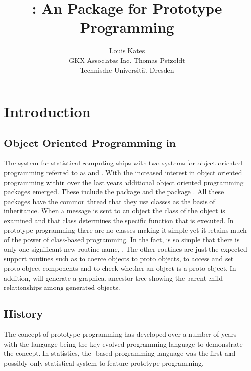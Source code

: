 \documentclass{Z}
\author{Louis Kates\\GKX Associates Inc. \And
        Thomas Petzoldt\\Technische Universit\"at Dresden}
\title{\pkg{proto}: An \proglang{R} Package for Prototype Programming}
\begin{document}
\section{Introduction} \label{sec:intro}

\subsection[Object Oriented Programming in R]{Object Oriented Programming in }

The  system for statistical computing
\citep[\url{http://www.R-project.org/}]{Rcore2005} ships with two
systems for object oriented programming referred to as 
and .  With the increased interest in object oriented
programming within  over the last years additional object
oriented programming packages emerged.  These include the 
package \citep{Bengtsson2003} and the  package
\citep[\url{http://www.omegahat.org/OOP/}]{Rnews:Chambers+Lang:2001a}.
All these packages have the common thread that they use
classes as the basis of inheritance.  When a message is sent to an
object the class of the object is examined and that class determines the
specific function that is executed. In prototype programming there
are no classes making it simple yet it retains much of the power of
class-based programming.  In the fact,  is so simple that
there is only one significant new routine name, .  The
other routines are just the expected support routines such as
 to coerce objects to proto objects, \code{\$} to
access and set proto object components and  to check
whether an object is a proto object.  In addition, 
will generate a graphical ancestor tree showing the parent-child
relationships among generated  objects.

\subsection{History}

The concept of 
prototype programming
\citep{Lieberman1986, Taivalsaari1996a, Noble1999}
has developed over a number of years with the 
language \citep{Agesen1992}
being the key evolved programming language to demonstrate
the concept.  In statistics, the -based
 programming language \citep{Tierney1990} was
the first and possibly only statistical system to feature prototype 
programming.
\end{document}
